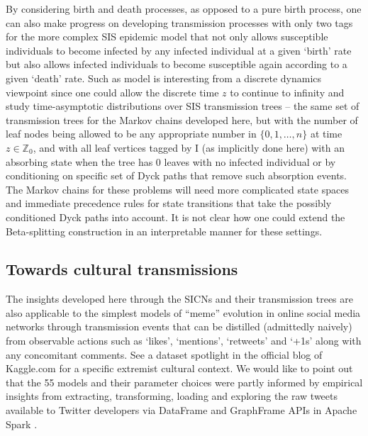 \documentclass[review]{elsarticle}
\numberwithin{equation}{section}
\begin{document}
By considering birth and death processes, as opposed to a pure birth process, one can also make progress on developing transmission processes with only two tags for the more complex SIS epidemic model that not only allows susceptible individuals to become infected by any infected individual at a given `birth' rate but also allows infected individuals to become susceptible again according to a given `death' rate.  Such as model is interesting from a discrete dynamics viewpoint since one could allow the discrete time $z$ to continue to infinity and study time-asymptotic distributions over SIS transmission trees -- the same set of transmission trees for the Markov chains developed here, but with the number of leaf nodes being allowed to be any appropriate number in $\{0,1,\ldots,n\}$ at time $z \in \mathbb{Z}_0$, and with all leaf vertices tagged by I (as implicitly done here) with an absorbing state when the tree has $0$ leaves with no infected individual or by conditioning on specific set of Dyck paths \citep{Addario-Berry2008} that remove such absorption events.
The Markov chains for these problems will need more complicated state spaces and immediate precedence rules for state transitions that take the possibly conditioned Dyck paths into account.  
It is not clear how one could extend the Beta-splitting construction in an interpretable manner for these settings. 
 
\subsection{Towards cultural transmissions}\label{S:D_TowardsCulturalTransmissions}
The insights developed here through the SICNs and their transmission trees are also applicable to the simplest models of ``meme'' \citep[][p.~192]{Dawkins1976} evolution in online social media networks \citep{SolonWIREDHawkinsMeme2013} through transmission events that can be distilled (admittedly naively) from observable actions such as `likes', `mentions', `retweets' and `+1s' along with any concomitant comments.  
See a dataset spotlight \citep{Rishal2016} in the official blog of Kaggle.com for a specific extremist cultural context.  
We would like to point out that the 55 models and their parameter choices were partly informed by empirical insights from extracting, transforming, loading and exploring the raw tweets available to Twitter developers via DataFrame and GraphFrame APIs in Apache Spark \citep{Zaharia:2010:SCC:1863103.1863113}.
\end{document}
